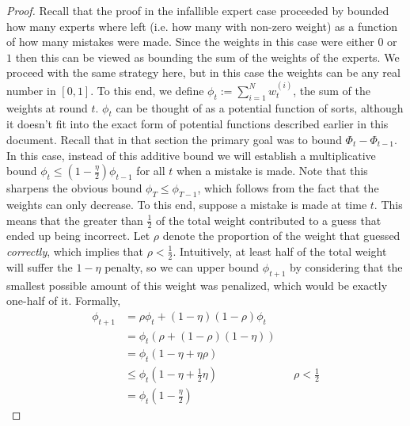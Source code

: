 \documentclass[12pt]{article}
\begin{document}
\begin{proof}
Recall that the proof in the infallible expert case proceeded by bounded how many experts where left (i.e. how many with non-zero weight) as a function of how many mistakes were made.  Since the 
weights in this case were either $0$ or $1$ then this can be viewed as bounding the sum of the weights of the experts. We proceed with the same strategy here, but in this case the weights can be any 
real number in $[0, 1]$. To this end, we define $\phi_t := \sum_{i = 1}^{N} w_t^{(i)}$, the sum of the weights at round $t$. $\phi_t$ can be thought of as a potential function of sorts, although it doesn't 
fit into the exact form of potential functions described earlier in this document. Recall that in that section the primary goal was to bound $\Phi_{t} - \Phi_{t - 1}$. In this case, instead of this additive bound 
we will establish a multiplicative bound $\phi_{t} \leq \left(1 - \frac{\eta}{2}\right)\phi_{t - 1}$ for all $t$ when a mistake is made. 
Note that this sharpens the obvious bound $\phi_T \leq \phi_{T - 1}$, which follows from the fact that the weights can only decrease. To this end, suppose a mistake is made at time $t$. This means that 
the greater than $\frac{1}{2}$ of the total weight contributed to a guess that ended up being incorrect. Let $\rho$ denote the proportion of the weight that guessed \textit{correctly}, which implies that 
$\rho < \frac{1}{2}$. Intuitively, at least half of the total weight will suffer the $1 - \eta$ penalty, so we can upper bound $\phi_{t + 1}$ by considering that the smallest possible amount of this weight 
was penalized, which would be exactly one-half of it. Formally, 
\begin{align*}
\phi_{t + 1} &= \rho \phi_t + (1 - \eta)(1 - \rho) \phi_t \\
		 &= \phi_t \left(\rho + (1 - \rho)(1 - \eta)\right) \\
		 &= \phi_t \left(1 - \eta + \eta \rho \right) \\
		 &\leq \phi_t \left(1 - \eta + \frac{1}{2}\eta \right) && \rho < \frac{1}{2} \\
		 &= \phi_t \left(1 - \frac{\eta}{2}\right)
\end{align*}


\end{proof}
\end{document}
